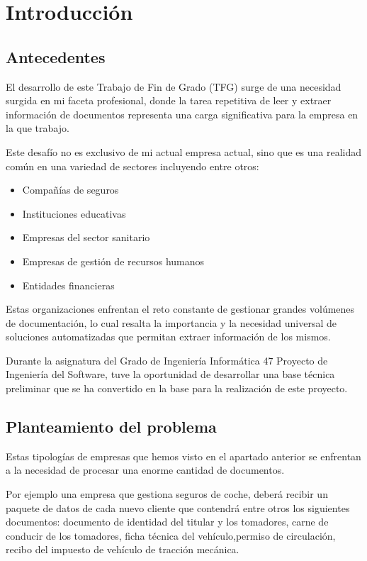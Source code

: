 \chapter{Introducción}\label{ch:chapter_1}


\section{Antecedentes}

El desarrollo de este Trabajo de Fin de Grado (TFG) surge de una necesidad surgida en mi faceta profesional, donde la
tarea repetitiva de leer y extraer información de documentos representa una carga significativa para la empresa en la
que trabajo.

Este desafío no es exclusivo de mi actual empresa actual, sino que es una realidad común en una variedad de sectores
incluyendo entre otros:

\begin{itemize}
    \item Compañías de seguros
    \item Instituciones educativas
    \item Empresas del sector sanitario
    \item Empresas de gestión de recursos humanos
    \item Entidades financieras
\end{itemize}

Estas organizaciones enfrentan el reto constante de gestionar grandes volúmenes de documentación, lo cual resalta la
importancia y la necesidad universal de soluciones automatizadas que permitan extraer información de los mismos.

Durante la asignatura del Grado de Ingeniería Informática 47 Proyecto de Ingeniería del Software, tuve la oportunidad de
desarrollar una base técnica preliminar que se ha convertido en la base para la realización de este proyecto.


\section{Planteamiento del problema}

Estas tipologías de empresas que hemos visto en el apartado anterior se enfrentan a la necesidad de procesar una enorme
cantidad de documentos.

Por ejemplo una empresa que gestiona seguros de coche, deberá recibir un paquete de datos de cada nuevo cliente que
contendrá entre otros los siguientes documentos: documento de identidad del titular y los tomadores, carne de conducir
de los tomadores, ficha técnica del vehículo,permiso de circulación, recibo del impuesto de vehículo de tracción
mecánica.

